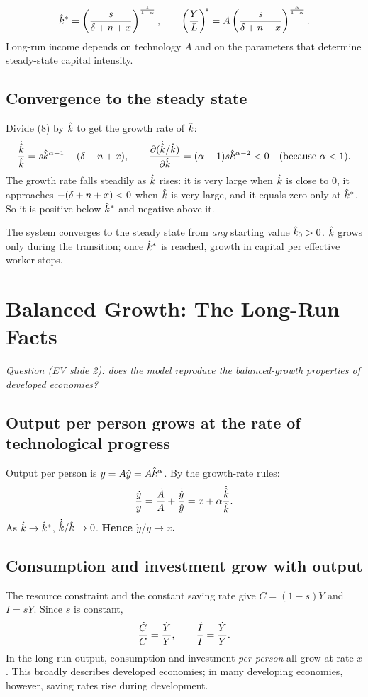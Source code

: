 \documentclass[11pt]{article}
\begin{document}
\begin{keyresult}
\[
\hat{k}^* = \left(\frac{s}{\delta+n+x}\right)^{\frac{1}{1-\alpha}}, \qquad
\left(\frac{Y}{L}\right)^{\!*} = A\left(\frac{s}{\delta+n+x}\right)^{\frac{\alpha}{1-\alpha}}.
\]
Long-run income depends on technology $A$ and on the parameters that determine steady-state capital intensity.
\end{keyresult}

\subsection{Convergence to the steady state}
Divide (8) by $\hat{k}$ to get the growth rate of $\hat{k}$:
\[
\frac{\dot{\hat{k}}}{\hat{k}} = s\hat{k}^{\alpha-1} - (\delta+n+x), \qquad
\frac{\partial(\dot{\hat{k}}/\hat{k})}{\partial\hat{k}} = (\alpha-1)s\hat{k}^{\alpha-2} < 0 \quad(\text{because } \alpha < 1).
\]
The growth rate falls steadily as $\hat{k}$ rises: it is very large when $\hat{k}$ is close to $0$, it approaches $-(\delta+n+x) < 0$ when $\hat{k}$ is very large, and it equals zero only at $\hat{k}^*$. So it is positive below $\hat{k}^*$ and negative above it.

\begin{keyresult}
The system converges to the steady state from \emph{any} starting value $\hat{k}_0 > 0$. $\hat{k}$ grows only during the transition; once $\hat{k}^*$ is reached, growth in capital per effective worker stops.
\end{keyresult}

\section{Balanced Growth: The Long-Run Facts}

\emph{Question (EV slide 2): does the model reproduce the balanced-growth properties of developed economies?}

\subsection{Output per person grows at the rate of technological progress}
Output per person is $y = A\hat{y} = A\hat{k}^{\alpha}$. By the growth-rate rules:
\[
\frac{\dot{y}}{y} = \frac{\dot{A}}{A} + \frac{\dot{\hat{y}}}{\hat{y}} = x + \alpha\frac{\dot{\hat{k}}}{\hat{k}}.
\]
As $\hat{k} \to \hat{k}^*$, $\dot{\hat{k}}/\hat{k} \to 0$. \textbf{Hence $\dot y/y \to x$.}

\subsection{Consumption and investment grow with output}
The resource constraint and the constant saving rate give $C = (1-s)Y$ and $I = sY$. Since $s$ is constant,
\[
\frac{\dot{C}}{C} = \frac{\dot{Y}}{Y}, \qquad \frac{\dot{I}}{I} = \frac{\dot{Y}}{Y}.
\]
In the long run output, consumption and investment \emph{per person} all grow at rate $x$. This broadly describes developed economies; in many developing economies, however, saving rates rise during development.
\end{document}
